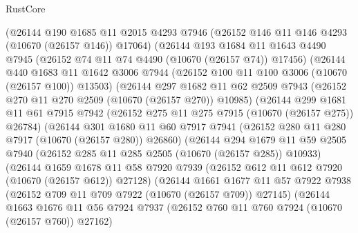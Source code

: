 \begin{lexlean}{RustCore}
\begin{coremodule}
          (@26144
            @190
            @1685
            @11
            @2015
            @4293
            @7946
            (@26152 @146 @11 @146 @4293 (@10670 (@26157 @146)) @17064)
            (@26144
              @193
              @1684
              @11
              @1643
              @4490
              @7945
              (@26152 @74 @11 @74 @4490 (@10670 (@26157 @74)) @17456)
              (@26144
                @440
                @1683
                @11
                @1642
                @3006
                @7944
                (@26152 @100 @11 @100 @3006 (@10670 (@26157 @100)) @13503)
                (@26144
                  @297
                  @1682
                  @11
                  @62
                  @2509
                  @7943
                  (@26152 @270 @11 @270 @2509 (@10670 (@26157 @270)) @10985)
                  (@26144
                    @299
                    @1681
                    @11
                    @61
                    @7915
                    @7942
                    (@26152 @275 @11 @275 @7915 (@10670 (@26157 @275)) @26784)
                    (@26144
                      @301
                      @1680
                      @11
                      @60
                      @7917
                      @7941
                      (@26152 @280 @11 @280 @7917 (@10670 (@26157 @280)) @26860)
                      (@26144
                        @294
                        @1679
                        @11
                        @59
                        @2505
                        @7940
                        (@26152 @285 @11 @285 @2505 (@10670 (@26157 @285)) @10933)
                        (@26144
                          @1659
                          @1678
                          @11
                          @58
                          @7920
                          @7939
                          (@26152 @612 @11 @612 @7920 (@10670 (@26157 @612)) @27128)
                          (@26144
                            @1661
                            @1677
                            @11
                            @57
                            @7922
                            @7938
                            (@26152 @709 @11 @709 @7922 (@10670 (@26157 @709)) @27145)
                            (@26144
                              @1663
                              @1676
                              @11
                              @56
                              @7924
                              @7937
                              (@26152 @760 @11 @760 @7924 (@10670 (@26157 @760)) @27162)

\end{coremodule}
\end{lexlean}
